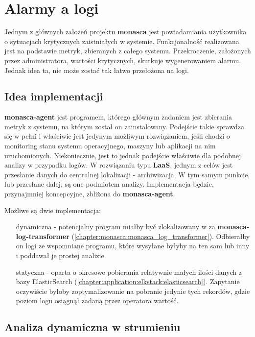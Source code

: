 \section{Alarmy a logi}
\label{chapter:application_own:plans:alarm_on_logs}

Jednym z głównych założeń projektu \textbf{monasca} jest powiadamiania użytkownika o 
sytuacjach krytycznych zaistniałych w systemie. Funkcjonalność realizowana jest na podstawie
metryk, zbieranych z całego systemu. Przekroczenie, założonych przez administratora, wartości
krytycznych, skutkuje wygenerowaniem alarmu. Jednak idea ta, nie może zostać
tak łatwo przełożona na logi. 

    \subsection{Idea implementacji}
    \textbf{monasca-agent} jest programem, którego głównym zadaniem jest zbierania metryk z systemu, na którym
    został on zainstalowany. Podejście takie sprawdza się w pełni i właściwie jest jedynym możliwym rozwiązaniem,
    jeśli chodzi o monitoring stanu systemu operacyjnego, maszyny lub aplikacji na nim uruchomionych. Niekoniecznie,
    jest to jednak podejście właściwie dla podobnej analizy w przypadku logów. W rozwiązaniu typu \textbf{LaaS}, 
    jednym z celów jest przesłanie danych do centralnej lokalizacji - archiwizacja. W tym samym punkcie, lub
    przesłane dalej, są one podmiotem analizy. Implementacja będzie, przynajmniej koncepcyjne, zbliżona do \textbf{monasca-agent}.
    
    Możliwe są dwie implementacja:
    \begin{itemize}
        \item[dynamiczna] - potencjalny program miałby być zlokalizowany w za \textbf{monasca-log-transformer} (\ref{chapter:monasca:monasca_log_transformer}).
        Odbierałby on logi ze wspomniane programu, które wysyłane byłyby na ten sam lub inny  i poddawał je prostej analizie. 
        \item[statyczna] - oparta o okresowe pobierania relatywnie małych ilości danych z bazy ElasticSearch (\ref{chapter:application:elkstack:elasticsearch}). 
        Zapytanie oczywiście byłoby zoptymalizowanie na pobranie jedynie tych rekordów, gdzie poziom logu osiągnął zadaną przez operatora wartość.
    \end{itemize}
    
    \subsection{Analiza dynamiczna w strumieniu}
    \label{chapter:application_own:plans:alarm_on_logs:streaming}
    
